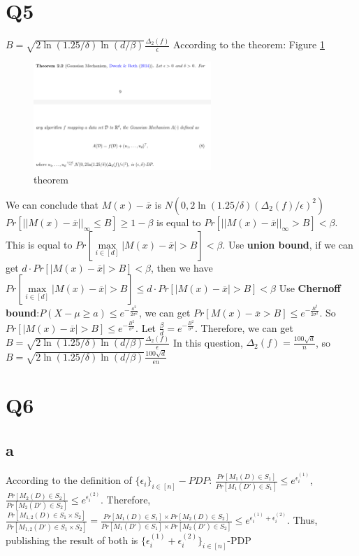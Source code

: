 \documentclass[12pt]{article}
\begin{document}
\section{Q5}
$B=\sqrt{2\ln(1.25/\delta)\ln(d/\beta)}\frac{\Delta_2(f)}{\epsilon}$
\newline
According to the theorem:
Figure \ref{fig:1}
\begin{figure}[htbp]
    \centering
    \includegraphics[width = 0.6\textwidth]{pic1.png}
    \caption{theorem}
    \label{fig:1}
\end{figure}
\newline
We can conclude that $M(x)-\overline{x}$ is $N(0,2\ln(1.25/\delta)(\Delta_2(f)/\epsilon)^2)$
\newline
$Pr[||M(x)-\overline{x}||_{\infty}\leq B]\geq 1-\beta$ is equal to $Pr[||M(x)-\overline{x}||_{\infty}>B]< \beta$.
This is equal to $Pr[\max\limits_{i\in [d]}|M(x)-\overline{x}|>B]<\beta$.
\newline
Use \textbf{union bound}, if we can get $d\cdot Pr[|M(x)-\overline{x}|>B]<\beta$, then we have $Pr[\max\limits_{i\in [d]}|M(x)-\overline{x}|>B]\leq d\cdot Pr[|M(x)-\overline{x}|>B]<\beta$
\newline
Use \textbf{Chernoff bound}:$P(X-\mu\geq a)\leq e^{-\frac{a^2}{2\sigma^2}}$, we can get $Pr[M(x)-\overline{x}>B]\leq e^{-\frac{B^2}{2\sigma^2}}$. So $Pr[|M(x)-\overline{x}|>B]\leq e^{-\frac{B^2}{\sigma^2}}$.
\newline
Let $\frac{\beta}{d}=e^{-\frac{B^2}{\sigma^2}}$.
Therefore, we can get $B=\sqrt{2\ln(1.25/\delta)\ln(d/\beta)}\frac{\Delta_2(f)}{\epsilon}$
\newline
In this question, $\Delta_2(f)=\frac{100\sqrt{d}}{n}$, so $B=\sqrt{2\ln(1.25/\delta)\ln(d/\beta)}\frac{100\sqrt{d}}{\epsilon n}$

\section{Q6}
\subsection{a}
According to the definition of $\{\epsilon_i\}_{i\in [n]}-PDP$:
$\frac{Pr[M_1(D)\in S_1]}{Pr[M_1(D')\in S_1]}\leq e^{\epsilon_i^{(1)}}$, $\frac{Pr[M_2(D)\in S_2]}{Pr[M_2(D')\in S_2]}\leq e^{\epsilon_i^{(2)}}$. Therefore,
$\frac{Pr[M_{1,2}(D)\in S_1\times S_2]}{Pr[M_{1,2}(D')\in S_1\times S_2]}=\frac{Pr[M_1(D)\in S_1]\times Pr[M_2(D)\in S_2]}{Pr[M_1(D')\in S_1]\times Pr[M_2(D')\in S_2]}\leq e^{\epsilon_i^{(1)}+ \epsilon_i^{(2)}}$.
\newline
Thus, publishing the result of both is $\{\epsilon_i^{(1)}+\epsilon_i^{(2)}\}_{i\in [n]}$-PDP
\end{document}
